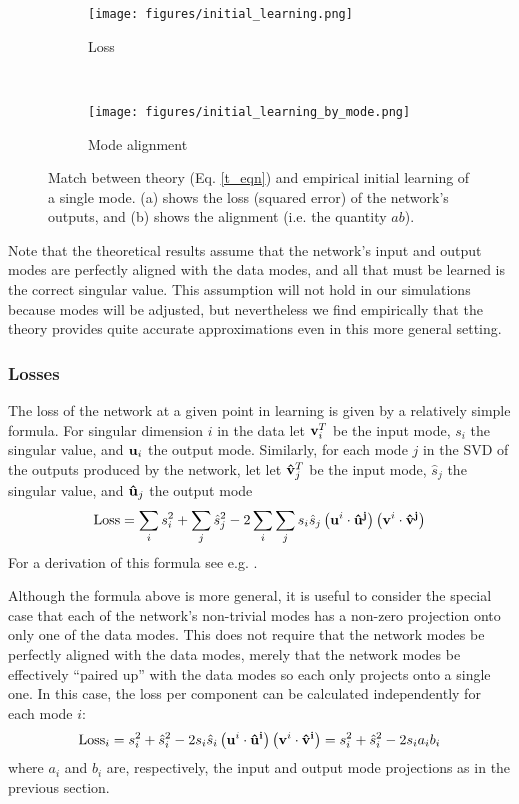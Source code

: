 \documentclass{article}
\newcommand{\bh}[1]{{\bf\hat{#1}}}
\begin{document}
\begin{figure}
\centering
\begin{subfigure}[b]{0.49\textwidth}
\texttt{[image: figures/initial\_learning.png]}
\caption{Loss} 
\end{subfigure}~%
\begin{subfigure}[b]{0.49\textwidth}
\texttt{[image: figures/initial\_learning\_by\_mode.png]}
\caption{Mode alignment} 
\end{subfigure}
\caption{Match between theory (Eq. \ref{t_eqn}) and empirical initial learning of a single mode. (a) shows the loss (squared error) of the network's outputs, and (b) shows the alignment (i.e. the quantity $ab$).}
\label{init_fig}
\end{figure}
Note that the theoretical results assume that the network's input and output modes are perfectly aligned with the data modes, and all that must be learned is the correct singular value. This assumption will not hold in our simulations because modes will be adjusted, but nevertheless we find empirically that the theory provides quite accurate approximations even in this more general setting.
\subsubsection{Losses}
The loss of the network at a given point in learning is given by a relatively simple formula. For singular dimension $i$ in the data let ${\bf v}_i^T$ be the input mode, $s_i$ the singular value, and ${\bf u}_i$ the output mode. Similarly, for each mode $j$ in the SVD of the outputs produced by the network, let let $\bh{v}_j^T$ be the input mode, $\hat{s}_j$ the singular value, and $\bh{u}_j$ the output mode
$$\text{Loss} = \sum_{i} s_{i}^2 +  \sum_{j} \hat{s}_{j}^2 - 2 \sum_{i}\sum_{j}  s_{i} \hat{s}_{j} \left({\bf u}^{i} \cdot \bf{\hat u}^{j} \right) \left({\bf v}^{i} \cdot \bf{\hat v}^{j} \right)$$
For a derivation of this formula see e.g. \citet{Lampinen2018}. \par %
Although the formula above is more general, it is useful to consider the special case that each of the network's non-trivial modes has a non-zero projection onto only one of the data modes. This does not require that the network modes be perfectly aligned with the data modes, merely that the network modes be effectively ``paired up'' with the data modes so each only projects onto a single one. In this case, the loss per component can be calculated independently for each mode $i$:
$$\text{Loss}_i = s_i^2 +  \hat{s}_{i}^2 - 2 s_{i} \hat{s}_{i} \left({\bf u}^{i} \cdot \bf{\hat u}^{i} \right) \left({\bf v}^{i} \cdot \bf{\hat v}^{i} \right) = s_i^2 +  \hat{s}_{i}^2 - 2 s_{i} a_i b_i$$
where $a_i$ and $b_i$ are, respectively, the input and output mode projections as in the previous section.
\end{document}
